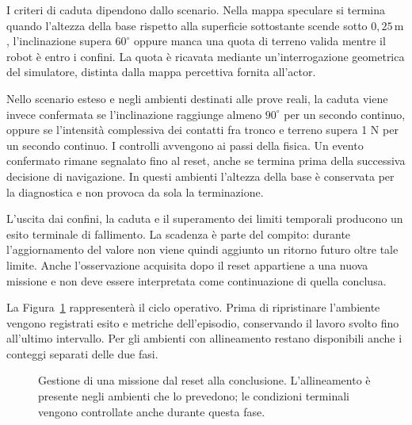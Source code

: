 I criteri di caduta dipendono dallo scenario. Nella mappa speculare si termina quando l'altezza della base rispetto alla superficie sottostante scende sotto $0{,}25\,\mathrm{m}$, l'inclinazione supera $60^\circ$ oppure manca una quota di terreno valida mentre il robot è entro i confini. La quota è ricavata mediante un'interrogazione geometrica del simulatore, distinta dalla mappa percettiva fornita all'actor.

Nello scenario esteso e negli ambienti destinati alle prove reali, la caduta viene invece confermata se l'inclinazione raggiunge almeno $90^\circ$ per un secondo continuo, oppure se l'intensità complessiva dei contatti fra tronco e terreno supera 1 N per un secondo continuo. I controlli avvengono ai passi della fisica. Un evento confermato rimane segnalato fino al reset, anche se termina prima della successiva decisione di navigazione. In questi ambienti l'altezza della base è conservata per la diagnostica e non provoca da sola la terminazione.

L'uscita dai confini, la caduta e il superamento dei limiti temporali producono un esito terminale di fallimento. La scadenza è parte del compito: durante l'aggiornamento del valore non viene quindi aggiunto un ritorno futuro oltre tale limite. Anche l'osservazione acquisita dopo il reset appartiene a una nuova missione e non deve essere interpretata come continuazione di quella conclusa.

La Figura~\ref{fig:metodo-ciclo-episodio} rappresenterà il ciclo operativo. Prima di ripristinare l'ambiente vengono registrati esito e metriche dell'episodio, conservando il lavoro svolto fino all'ultimo intervallo. Per gli ambienti con allineamento restano disponibili anche i conteggi separati delle due fasi.

\begin{figure}[tbp]
    \centering
    \caption[Ciclo degli episodi di navigazione]{Gestione di una missione dal reset alla conclusione. L'allineamento è presente negli ambienti che lo prevedono; le condizioni terminali vengono controllate anche durante questa fase.}
    \label{fig:metodo-ciclo-episodio}
\end{figure}

